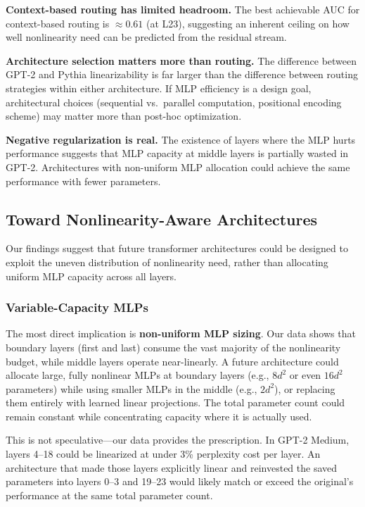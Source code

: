 \documentclass[11pt]{article}
\begin{document}
\textbf{Context-based routing has limited headroom.} The best achievable AUC for context-based routing is $\approx 0.61$ (at L23), suggesting an inherent ceiling on how well nonlinearity need can be predicted from the residual stream.

\textbf{Architecture selection matters more than routing.} The difference between GPT-2 and Pythia linearizability is far larger than the difference between routing strategies within either architecture. If MLP efficiency is a design goal, architectural choices (sequential vs.\ parallel computation, positional encoding scheme) may matter more than post-hoc optimization.

\textbf{Negative regularization is real.} The existence of layers where the MLP hurts performance suggests that MLP capacity at middle layers is partially wasted in GPT-2. Architectures with non-uniform MLP allocation could achieve the same performance with fewer parameters.

\subsection{Toward Nonlinearity-Aware Architectures}
\label{sec:future}

Our findings suggest that future transformer architectures could be designed to exploit the uneven distribution of nonlinearity need, rather than allocating uniform MLP capacity across all layers.

\subsubsection{Variable-Capacity MLPs}

The most direct implication is \textbf{non-uniform MLP sizing}. Our data shows that boundary layers (first and last) consume the vast majority of the nonlinearity budget, while middle layers operate near-linearly. A future architecture could allocate large, fully nonlinear MLPs at boundary layers (e.g., $8d^2$ or even $16d^2$ parameters) while using smaller MLPs in the middle (e.g., $2d^2$), or replacing them entirely with learned linear projections. The total parameter count could remain constant while concentrating capacity where it is actually used.

This is not speculative---our data provides the prescription. In GPT-2 Medium, layers 4--18 could be linearized at under 3\% perplexity cost per layer. An architecture that made those layers explicitly linear and reinvested the saved parameters into layers 0--3 and 19--23 would likely match or exceed the original's performance at the same total parameter count.
\end{document}
